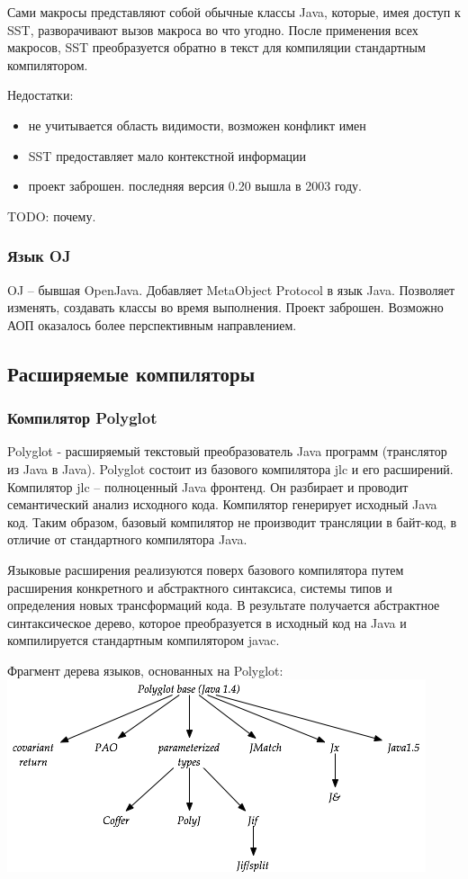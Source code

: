\documentclass[a4paper,12pt]{article}
\begin{document}
Сами макросы представляют собой обычные классы Java, которые, имея доступ к
SST, разворачивают вызов макроса во что угодно. После применения всех макросов,
SST преобразуется обратно в текст для компиляции стандартным компилятором.

Недостатки:
\begin{itemize}
 \item не учитывается область видимости, возможен конфликт имен
 \item SST предоставляет мало контекстной информации
 \item проект заброшен. последняя версия 0.20 вышла в 2003 году.
\end{itemize}
TODO: почему.

\subsubsection*{Язык OJ}
OJ -- бывшая OpenJava. Добавляет MetaObject Protocol в язык Java.
Позволяет изменять, создавать классы во время выполнения.
Проект заброшен. Возможно АОП оказалось более перспективным направлением.

\subsection{Расширяемые компиляторы}
\label{extcomp}
\subsubsection*{Компилятор Polyglot}
Polyglot - расширяемый текстовый преобразователь Java программ (транслятор из
Java в Java). Polyglot состоит из базового компилятора jlc и его расширений.
Компилятор jlc -- полноценный Java фронтенд. Он разбирает и проводит
семантический анализ исходного кода. Компилятор генерирует исходный Java код.
Таким образом, базовый компилятор не производит трансляции в байт-код, в
отличие от стандартного компилятора Java.

Языковые расширения реализуются поверх базового компилятора путем расширения
конкретного и абстрактного синтаксиса, системы типов и определения новых
трансформаций кода. В результате получается абстрактное синтаксическое дерево,
которое преобразуется в исходный код на Java и компилируется стандартным
компилятором javac.

\begin{center}
Фрагмент дерева языков, основанных на Polyglot:
\nopagebreak
 \includegraphics[scale=0.6]{img/polyglot-tree.png}
\end{center}
\end{document}
